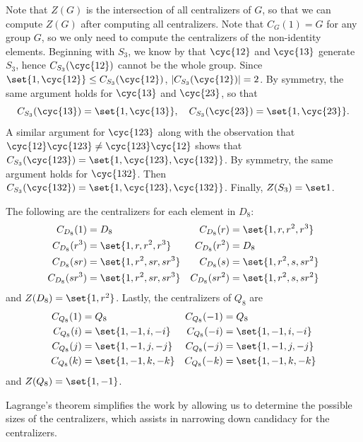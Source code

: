\begin{sol}[spsol]
    Note that $Z(G)$ is the intersection of all centralizers of $G$, so that we can compute $Z(G)$ after computing all centralizers.
	Note that $C_G(1) = G$ for any group $G$, so we only need to compute the centralizers of the non-identity elements.
	Beginning with $S_3$, we know by  that $\cyc{1 2}$ and $\cyc{1 3}$ generate $S_3$, hence $C_{S_3}(\cyc{1 2})$ cannot be the whole group.
	Since $\set{1, \cyc{1 2}} \leq C_{S_3}(\cyc{1 2})$, $|C_{S_3}(\cyc{1 2})| = 2$.
	By symmetry, the same argument holds for $\cyc{1 3}$ and $\cyc{2 3}$, so that
    \[
    	C_{S_3}(\cyc{1 3}) = \set{1, \cyc{1 3}}, \quad C_{S_3}(\cyc{2 3}) = \set{1, \cyc{2 3}}.
    \]
    A similar argument for $\cyc{1 2 3}$ along with the observation that $\cyc{1 2}\cyc{1 2 3} \neq \cyc{1 2 3}\cyc{1 2}$ shows that $C_{S_3}(\cyc{1 2 3}) = \set{1, \cyc{1 2 3}, \cyc{1 3 2}}$.
	By symmetry, the same argument holds for $\cyc{1 3 2}$.
	Then $C_{S_3}(\cyc{1 3 2}) = \set{1, \cyc{1 2 3}, \cyc{1 3 2}}$.
	Finally, $Z(S_3) = \set 1$.
    
    The following are the centralizers for each element in $D_8$:
    \begin{align*}
        C_{D_8}(1) & = D_8 & C_{D_8}(r) & = \set{1, r, r^2, r^3} \\
        C_{D_8}(r^3) & = \set{1, r, r^2, r^3} & C_{D_8}(r^2) & = D_8 \\
        C_{D_8}(sr) & = \set{1, r^2, sr, sr^3} & C_{D_8}(s) & = \set{1, r^2, s, sr^2} \\
        C_{D_8}(sr^3) & = \set{1, r^2, sr, sr^3} & C_{D_8}(sr^2) & = \set{1, r^2, s, sr^2}
    \end{align*}
    and $Z(D_8) = \set{1, r^2}$.
	Lastly, the centralizers of $Q_8$ are
    \begin{align*}
        C_{Q_8}(1) & = Q_8 & C_{Q_8}(-1) & = Q_8 \\
        C_{Q_8}(i) & = \set{1, -1, i, -i} & C_{Q_8}(-i) & = \set{1, -1, i, -i} \\
        C_{Q_8}(j) & = \set{1, -1, j, -j} & C_{Q_8}(-j) & = \set{1, -1, j, -j} \\
        C_{Q_8}(k) & = \set{1, -1, k, -k} & C_{Q_8}(-k) & = \set{1, -1, k, -k}
    \end{align*}
    and $Z(Q_8) = \set{1, -1}$.

    Lagrange's theorem simplifies the work by allowing us to determine the possible sizes of the centralizers, which assists in narrowing down candidacy for the centralizers.
\end{sol}

